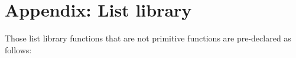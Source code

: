 \section*{Appendix: List library}

Those list library functions that are not primitive functions are pre-declared as follows:




